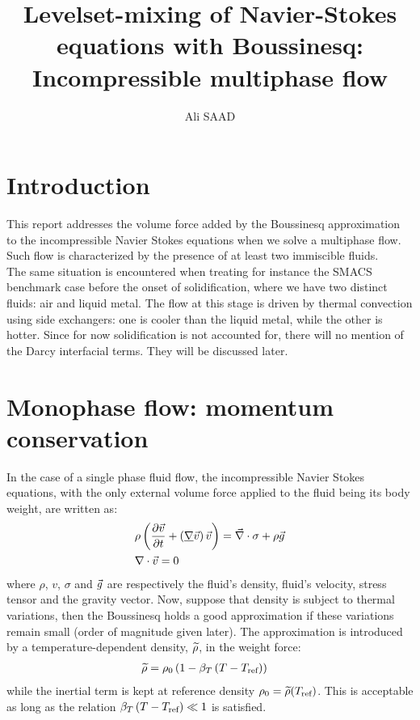 \documentclass[11pt,a4paper]{article}
\title{Levelset-mixing of Navier-Stokes equations with Boussinesq:\\ Incompressible multiphase flow }
\author{Ali SAAD}
\begin{document}
\maketitle
\section{Introduction}
This report addresses the volume force added by the Boussinesq approximation to the incompressible Navier Stokes equations
when we solve a multiphase flow. Such flow is characterized by the presence of at least two immiscible fluids. \\
The same situation is encountered when treating for instance the SMACS benchmark case before the onset of solidification, where we have two distinct fluids: air and liquid metal.
The flow at this stage is driven by thermal convection using side exchangers: one is cooler than the liquid metal, while the other is hotter.
Since for now solidification is not accounted for, there will no mention of the Darcy interfacial terms. They will be discussed later.
\section{Monophase flow: momentum conservation}
In the case of a single phase fluid flow, the incompressible Navier Stokes equations, with the only external volume 
force applied to the fluid being its body weight, are written as:
\begin{align}
\label{eq:NS_monophase}
& \rho \left( \frac{\partial \vec{v}}{\partial t} + \left( \underline{\nabla} \vec{v} \right) \vec{v}  \right) = \vec{\nabla} \cdot \sigma + \rho \vec{g} \\ 
& \nabla \cdot \vec{v} = 0
\end{align}
where $\rho$, $v$, $\sigma$ and $\vec{g}$ are respectively the fluid's density, fluid's velocity, stress tensor and the gravity vector.
Now, suppose that density is subject to thermal variations, then the Boussinesq holds a good approximation if these variations remain small (order of magnitude given later).
The approximation is introduced by a temperature-dependent density, $\widetilde{\rho}$, in the weight force:
\begin{align}
\label{eq:boussinesq}
\rhobouss %
          	&= \rho_0 \brac{1-\betaT \brac{T-\Tref}}
\end{align}
while the inertial term is kept at reference density $\rho_0 = \widetilde{\rho}(T_{\text{ref}})$. This is acceptable as long as the relation
$\beta_T \left( T-T_{\text{ref}} \right) \ll 1$ is satisfied.
\end{document}
